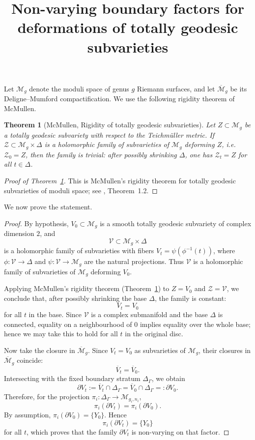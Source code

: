 \documentclass{article}
\newtheorem{theorem}{Theorem}[section]
\theoremstyle{remark}
\newcommand{\M}{\mathcal{M}}
\newcommand{\D}{\Delta}
\newcommand{\G}{\Gamma}
\newcommand{\p}{\partial}
\newcommand{\barM}{\overline{\M}_g}
\begin{document}
\title{Non-varying boundary factors for deformations of totally geodesic subvarieties}
\author{}
\date{}
\maketitle

Let $\M_g$ denote the moduli space of genus $g$ Riemann surfaces, and let
$\barM$ be its Deligne--Mumford compactification.  We use the following
rigidity theorem of McMullen.

\begin{theorem}[McMullen, Rigidity of totally geodesic subvarieties]\label{thm:rigidity}
Let $Z\subset \M_g$ be a totally geodesic subvariety with respect to the
Teichm\"uller metric.  If $\mathcal Z\subset \M_g\times \D$ is a holomorphic
family of subvarieties of $\M_g$ deforming $Z$, i.e.\ $\mathcal Z_0=Z$, then
the family is trivial: after possibly shrinking $\D$, one has
$\mathcal Z_t=Z$ for all $t\in \D$.
\end{theorem}

\begin{proof}[Proof of Theorem~\ref{thm:rigidity}]
This is McMullen's rigidity theorem for totally geodesic subvarieties of
moduli space; see \cite{McMullen}, Theorem~1.2.
\end{proof}

We now prove the statement.

\begin{proof}
By hypothesis, $V_0\subset \M_g$ is a smooth totally geodesic subvariety of
complex dimension $2$, and
\[
\mathcal V\subset \M_g\times \D
\]
is a holomorphic family of subvarieties with fibers
$V_t=\psi(\phi^{-1}(t))$, where
$\phi:\mathcal V\to \D$ and $\psi:\mathcal V\to \M_g$ are the natural
projections.  Thus $\mathcal V$ is a holomorphic family of subvarieties of
$\M_g$ deforming $V_0$.

Applying McMullen's rigidity theorem (Theorem~\ref{thm:rigidity}) to
$Z=V_0$ and $\mathcal Z=\mathcal V$, we conclude that, after possibly
shrinking the base $\D$, the family is constant:
\[
V_t=V_0
\]
for all $t$ in the base.  Since $\mathcal V$ is a complex submanifold and
the base $\D$ is connected, equality on a neighbourhood of $0$ implies
equality over the whole base; hence we may take this to hold for all $t$ in
the original disc.

Now take the closure in $\barM$.  Since $V_t=V_0$ as subvarieties of
$\M_g$, their closures in $\barM$ coincide:
\[
\overline V_t=\overline V_0.
\]
Intersecting with the fixed boundary stratum $\D_\G$, we obtain
\[
\p V_t
:=\overline V_t\cap \D_\G
=\overline V_0\cap \D_\G
=:\p V_0.
\]
Therefore, for the projection $\pi_i:\D_\G\to \M_{g_i,n_i}$,
\[
\pi_i(\p V_t)=\pi_i(\p V_0).
\]
By assumption, $\pi_i(\p V_0)=\{Y_0\}$.  Hence
\[
\pi_i(\p V_t)=\{Y_0\}
\]
for all $t$, which proves that the family $\p V_t$ is non-varying on that
factor.
\end{proof}
\end{document}
